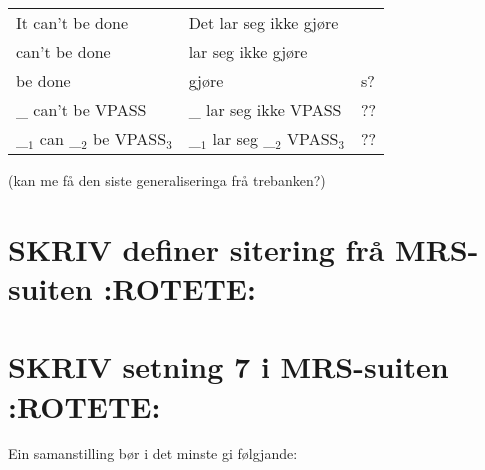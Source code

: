 \documentclass[11pt,a4paper,oneside,draft]{book}
\begin{document}
\begin{center}
\begin{tabular}{lll}
 It can't be done                    &  Det lar seg ikke gjøre               &      \\
 can't be done                       &  lar seg ikke gjøre                   &      \\
 be done                             &  gjøre                                &  s?  \\
 \_{} can't be VPASS                 &  \_{} lar seg ikke VPASS              &  ??  \\
 \_$_{1}$ can \_$_{2}$ be VPASS$_3$  &  \_$_{1}$ lar seg \_$_{2}$ VPASS$_3$  &  ??  \\
\end{tabular}
\end{center}




(kan me få den siste generaliseringa frå trebanken?)


\section{\textbf{SKRIV} definer sitering frå MRS-suiten \textbf{:ROTETE:}}
\label{sec-3.20}

\section{\textbf{SKRIV} setning 7 i MRS-suiten \textbf{:ROTETE:}}
\label{sec-3.21}



  

Ein samanstilling bør i det minste gi følgjande:
\end{document}
